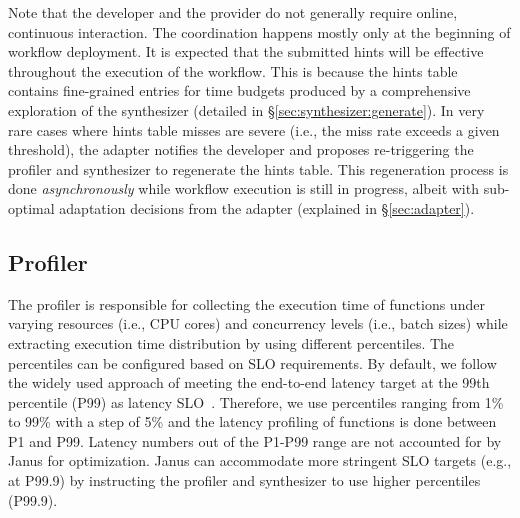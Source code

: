 Note that the developer and the provider do not generally require online, continuous interaction.
The coordination happens mostly only at the beginning of workflow deployment. 
It is expected that the submitted hints will be effective throughout the execution of the workflow. 
This is because the hints table contains fine-grained entries for time budgets produced by a comprehensive exploration of the synthesizer (detailed in \S\ref{sec:synthesizer:generate}). 
In very rare cases where hints table misses are severe (i.e., the miss rate exceeds a given threshold), the adapter notifies the developer and proposes re-triggering the profiler and synthesizer to regenerate the hints table. This regeneration process is done \emph{asynchronously} while workflow execution is still in progress, albeit with sub-optimal adaptation decisions from the adapter (explained in \S{\ref{sec:adapter}}). 


\subsection{Profiler}
\label{sec:profilier}
The profiler is responsible for collecting the execution time of functions under varying resources (i.e., CPU cores) and concurrency levels (i.e., batch sizes) while extracting execution time distribution by using different percentiles. 
The percentiles can be configured based on SLO requirements.
By default, we follow the widely used approach of meeting the end-to-end latency target at the 99th percentile (P99) as latency SLO~\cite{osdi22-orion,mac22-wisefuse}.
Therefore, we use percentiles ranging from 1\% to 99\% with a step of 5\% and the latency profiling of functions is done between P1 and P99. Latency numbers out of the P1-P99 range are not accounted for by Janus for optimization. 
Janus can accommodate more stringent SLO targets (e.g., at P99.9) by instructing the profiler and synthesizer to use higher percentiles (P99.9). 


